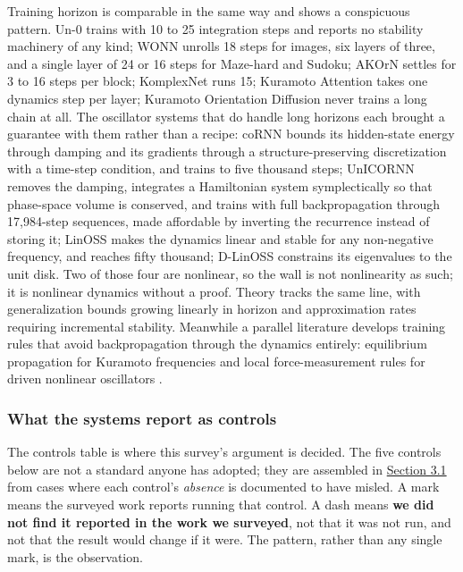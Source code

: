 \documentclass[a4paper,fleqn]{cas-sc}
\begin{document}
Training horizon is comparable in the same way and shows a conspicuous
pattern. Un-0 trains with 10 to 25 integration steps and reports no
stability machinery of any kind; WONN unrolls 18 steps for images, six
layers of three, and a single layer of 24 or 16 steps for Maze-hard and
Sudoku; AKOrN settles for 3 to 16 steps per block; KomplexNet runs 15;
Kuramoto Attention takes one dynamics step per layer; Kuramoto
Orientation Diffusion never trains a long chain at all. The oscillator
systems that do handle long horizons each brought a guarantee with them
rather than a recipe: coRNN bounds its hidden-state energy through
damping and its gradients through a structure-preserving discretization
with a time-step condition, and trains to five thousand steps; UnICORNN
removes the damping, integrates a Hamiltonian system symplectically so
that phase-space volume is conserved, and trains with full
backpropagation through 17,984-step sequences, made affordable by
inverting the recurrence instead of storing it; LinOSS makes the
dynamics linear and stable for any non-negative frequency, and reaches
fifty thousand; D-LinOSS constrains its eigenvalues to the unit disk.
Two of those four are nonlinear, so the wall is not nonlinearity as
such; it is nonlinear dynamics without a proof. Theory tracks the same
line, with generalization bounds growing linearly in horizon and
approximation rates requiring incremental stability. Meanwhile a
parallel literature develops training rules that avoid backpropagation
through the dynamics entirely: equilibrium propagation for Kuramoto
frequencies \citep{ahmadi2026} and local force-measurement rules for
driven nonlinear oscillators \citep{bosch2025}.

\subsubsection{What the systems report as controls}\label{sec-2-3-3}

The controls table is where this survey's argument is decided. The five
controls below are not a standard anyone has adopted; they are assembled
in \hyperref[sec-3-1]{Section 3.1} from cases where each control's
\emph{absence} is documented to have misled. A mark means the surveyed
work reports running that control. A dash means \textbf{we did not find
it reported in the work we surveyed}, not that it was not run, and not
that the result would change if it were. The pattern, rather than any
single mark, is the observation.
\end{document}
